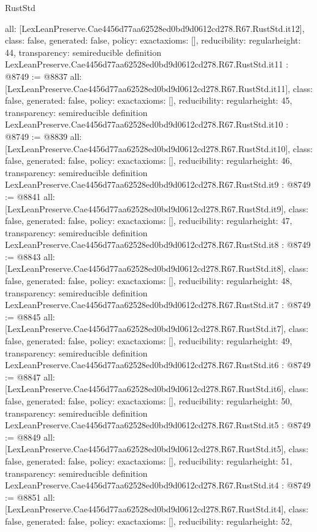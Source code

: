 \begin{lexlean}{RustStd}
\begin{coremodule}
{  all: [LexLeanPreserve.Cae4456d77aa62528ed0bd9d0612cd278.R67.RustStd.it12],
  class: false,
  generated: false,
  policy: exact{axioms: []},
  reducibility: regular{height: 44},
  transparency: semireducible
}
definition LexLeanPreserve.Cae4456d77aa62528ed0bd9d0612cd278.R67.RustStd.it11 : @8749 := @8837 {
  all: [LexLeanPreserve.Cae4456d77aa62528ed0bd9d0612cd278.R67.RustStd.it11],
  class: false,
  generated: false,
  policy: exact{axioms: []},
  reducibility: regular{height: 45},
  transparency: semireducible
}
definition LexLeanPreserve.Cae4456d77aa62528ed0bd9d0612cd278.R67.RustStd.it10 : @8749 := @8839 {
  all: [LexLeanPreserve.Cae4456d77aa62528ed0bd9d0612cd278.R67.RustStd.it10],
  class: false,
  generated: false,
  policy: exact{axioms: []},
  reducibility: regular{height: 46},
  transparency: semireducible
}
definition LexLeanPreserve.Cae4456d77aa62528ed0bd9d0612cd278.R67.RustStd.it9 : @8749 := @8841 {
  all: [LexLeanPreserve.Cae4456d77aa62528ed0bd9d0612cd278.R67.RustStd.it9],
  class: false,
  generated: false,
  policy: exact{axioms: []},
  reducibility: regular{height: 47},
  transparency: semireducible
}
definition LexLeanPreserve.Cae4456d77aa62528ed0bd9d0612cd278.R67.RustStd.it8 : @8749 := @8843 {
  all: [LexLeanPreserve.Cae4456d77aa62528ed0bd9d0612cd278.R67.RustStd.it8],
  class: false,
  generated: false,
  policy: exact{axioms: []},
  reducibility: regular{height: 48},
  transparency: semireducible
}
definition LexLeanPreserve.Cae4456d77aa62528ed0bd9d0612cd278.R67.RustStd.it7 : @8749 := @8845 {
  all: [LexLeanPreserve.Cae4456d77aa62528ed0bd9d0612cd278.R67.RustStd.it7],
  class: false,
  generated: false,
  policy: exact{axioms: []},
  reducibility: regular{height: 49},
  transparency: semireducible
}
definition LexLeanPreserve.Cae4456d77aa62528ed0bd9d0612cd278.R67.RustStd.it6 : @8749 := @8847 {
  all: [LexLeanPreserve.Cae4456d77aa62528ed0bd9d0612cd278.R67.RustStd.it6],
  class: false,
  generated: false,
  policy: exact{axioms: []},
  reducibility: regular{height: 50},
  transparency: semireducible
}
definition LexLeanPreserve.Cae4456d77aa62528ed0bd9d0612cd278.R67.RustStd.it5 : @8749 := @8849 {
  all: [LexLeanPreserve.Cae4456d77aa62528ed0bd9d0612cd278.R67.RustStd.it5],
  class: false,
  generated: false,
  policy: exact{axioms: []},
  reducibility: regular{height: 51},
  transparency: semireducible
}
definition LexLeanPreserve.Cae4456d77aa62528ed0bd9d0612cd278.R67.RustStd.it4 : @8749 := @8851 {
  all: [LexLeanPreserve.Cae4456d77aa62528ed0bd9d0612cd278.R67.RustStd.it4],
  class: false,
  generated: false,
  policy: exact{axioms: []},
  reducibility: regular{height: 52},
}
\end{coremodule}
\end{lexlean}
